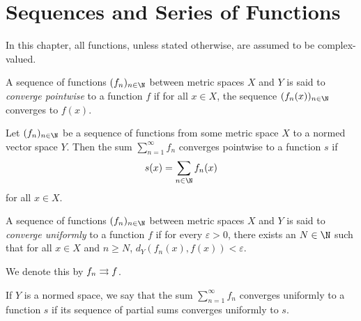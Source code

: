 \chapter{Sequences and Series of Functions} \label{chp:ssfn}
In this chapter, all functions, unless stated otherwise, are assumed
to be complex-valued.
\begin{definition} \label{def:ssfn:pointwise}
    A sequence of functions $(f_n)_{n \in \N}$ between metric spaces
    $X$ and $Y$ is said to \emph{converge pointwise} to a function $f$
    if for all $x \in X$, the sequence $(f_n(x))_{n \in \N}$ converges to
    $f(x)$.
\end{definition}
\begin{definition} \label{def:ssfn:pointwise_sum}
    Let $(f_n)_{n \in \N}$ be a sequence of functions from some metric
    space $X$ to a normed vector space $Y$.
    Then the sum $\sum_{n=1}^{\infty} f_n$ converges pointwise to a function
    $s$ if \[
        s(x) = \sum_{n \in \N} f_n(x)
    \] for all $x \in X$.
\end{definition}

\begin{definition*} \label{def:ssfn:unif}
    A sequence of functions $(f_n)_{n \in \N}$ between metric spaces
    $X$ and $Y$ is said to \emph{converge uniformly} to a function $f$
    if for every $\varepsilon > 0$, there exists an $N \in \N$ such that
    for all $x \in X$ and $n \ge N$, $d_Y(f_n(x), f(x)) < \varepsilon$.

    We denote this by $f_n \rightrightarrows f$.

    If $Y$ is a normed space, we say that the sum $\sum_{n=1}^{\infty} f_n$
    converges uniformly to a function $s$ if its sequence of partial sums
    converges uniformly to $s$.
\end{definition*}

